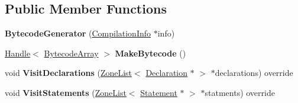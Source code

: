 \subsection*{Public Member Functions}
\begin{DoxyCompactItemize}
\item 
{\bfseries Bytecode\+Generator} (\hyperlink{classv8_1_1internal_1_1_compilation_info}{Compilation\+Info} $\ast$info)\hypertarget{classv8_1_1internal_1_1interpreter_1_1_bytecode_generator_a5e7846efeee1a24ed0b4e975d6c7f0fc}{}\label{classv8_1_1internal_1_1interpreter_1_1_bytecode_generator_a5e7846efeee1a24ed0b4e975d6c7f0fc}

\item 
\hyperlink{classv8_1_1internal_1_1_handle}{Handle}$<$ \hyperlink{classv8_1_1internal_1_1_bytecode_array}{Bytecode\+Array} $>$ {\bfseries Make\+Bytecode} ()\hypertarget{classv8_1_1internal_1_1interpreter_1_1_bytecode_generator_affc615ad2a1a78c079a74c217841f2b3}{}\label{classv8_1_1internal_1_1interpreter_1_1_bytecode_generator_affc615ad2a1a78c079a74c217841f2b3}

\item 
void {\bfseries Visit\+Declarations} (\hyperlink{classv8_1_1internal_1_1_zone_list}{Zone\+List}$<$ \hyperlink{classv8_1_1internal_1_1_declaration}{Declaration} $\ast$ $>$ $\ast$declarations) override\hypertarget{classv8_1_1internal_1_1interpreter_1_1_bytecode_generator_a365dd36a7343c455714e0fc2d237be5d}{}\label{classv8_1_1internal_1_1interpreter_1_1_bytecode_generator_a365dd36a7343c455714e0fc2d237be5d}

\item 
void {\bfseries Visit\+Statements} (\hyperlink{classv8_1_1internal_1_1_zone_list}{Zone\+List}$<$ \hyperlink{classv8_1_1internal_1_1_statement}{Statement} $\ast$ $>$ $\ast$statments) override\hypertarget{classv8_1_1internal_1_1interpreter_1_1_bytecode_generator_a1f848fedfd63304f834d8ed9020c0273}{}\label{classv8_1_1internal_1_1interpreter_1_1_bytecode_generator_a1f848fedfd63304f834d8ed9020c0273}

\end{DoxyCompactItemize}
